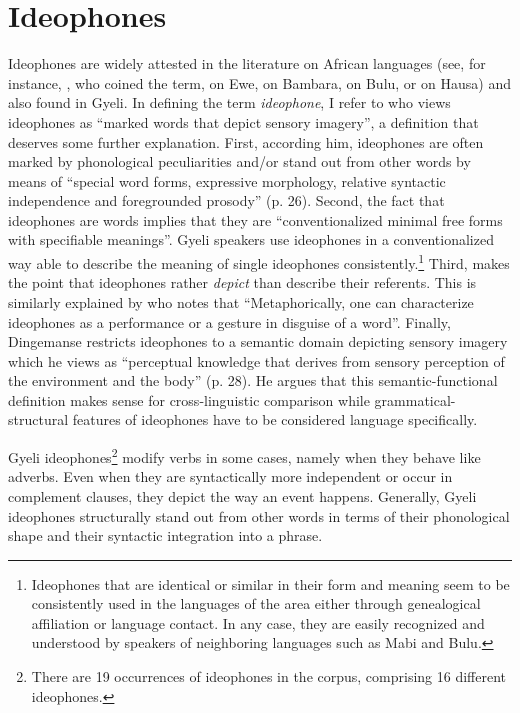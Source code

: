 \section{Ideophones}
\label{sec:IDEO}


Ideophones are widely attested in the literature on African languages (see, for instance, \citet{doke1935}, who coined the term, \citet{westermann07} on Ewe, \citet{dumestre98} on Bambara, \citet{alexandre66} on Bulu, or  \citet{newman2001} on Hausa) and also found in Gyeli.  In defining the term {\itshape ideophone}, I refer to \citet[25]{dingemanse2011} who views ideophones as ``marked words that depict sensory imagery'', a definition that deserves some further explanation. First, according him, ideophones are often marked by phonological peculiarities and/or stand out from other words by means of ``special word forms, expressive morphology, relative syntactic independence and foregrounded prosody'' (p. 26). Second, the fact that ideophones are words implies that they are ``conventionalized minimal free forms with specifiable meanings''. Gyeli speakers use ideophones in a conventionalized way able to describe the meaning of single ideophones consistently.\footnote{Ideophones that are identical or similar in their form and meaning seem to be consistently used in the languages of the area either through genealogical affiliation or language contact. In any case, they are easily recognized and understood by speakers of neighboring languages such as Mabi and Bulu.} Third, \citet[27]{dingemanse2011} makes the point that ideophones rather {\itshape depict} than describe their referents. This is similarly explained by \citet[280]{guldemann2008} who notes that ``Metaphorically, one can characterize ideophones as a performance or a gesture in disguise of a word''.
Finally, Dingemanse restricts ideophones to a semantic domain depicting sensory imagery which he views as ``perceptual knowledge that derives from sensory perception of the environment and the body'' (p. 28).
He argues that this semantic-functional definition makes sense for cross-linguistic comparison while grammatical-structural features of ideophones have to be considered language specifically.  

Gyeli ideophones\footnote{There are 19 occurrences of ideophones in the corpus, comprising 16 different ideophones.} modify verbs in some cases, namely when they behave like adverbs. Even when they are syntactically more independent or occur in  complement clauses, they depict the way an event happens.
Generally, Gyeli ideophones structurally stand out from other words in terms of their phonological shape and their syntactic integration into a phrase.


